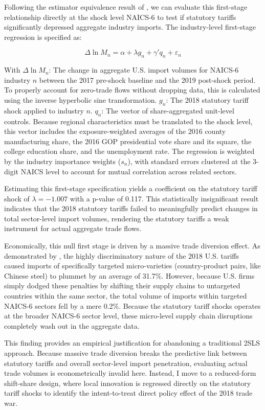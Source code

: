 \documentclass[12pt]{article}
\numberwithin{figure}{section}
\numberwithin{table}{section}
\begin{document}
Following the estimator equivalence result of \cite{BHJ2022}, we can evaluate this first-stage relationship directly at the shock level NAICS-6 to test if statutory tariffs significantly depressed aggregate industry imports. The industry-level first-stage regression is specified as:

$$ \Delta \ln M_n = \alpha + \lambda g_n + \gamma' q_n + \varepsilon_n $$

With $\Delta \ln M_n$: The change in aggregate U.S. import volumes for NAICS-6 industry $n$ between the 2017 pre-shock baseline and the 2019 post-shock period. To properly account for zero-trade flows without dropping data, this is calculated using the inverse hyperbolic sine transformation.
$g_n$: The 2018 statutory tariff shock applied to industry $n$.
$q_n$: The vector of share-aggregated unit-level controls. Because regional characteristics must be translated to the shock level, this vector includes the exposure-weighted averages of the 2016 county manufacturing share, the 2016 GOP presidential vote share and its square, the college education share, and the unemployment rate. The regression is weighted by the industry importance weights ($s_n$), with standard errors clustered at the 3-digit NAICS level to account for mutual correlation across related sectors.

Estimating this first-stage specification yields a coefficient on the statutory tariff shock of $\lambda = -1.007$ with a p-value of 0.117. This statistically insignificant result indicates that the 2018 statutory tariffs failed to meaningfully predict changes in total sector-level import volumes, rendering the statutory tariffs a weak instrument for actual aggregate trade flows. 

Economically, this null first stage is driven by a massive trade diversion effect. As demonstrated by \cite{Fajgelbaum2020}, the highly discriminatory nature of the 2018 U.S. tariffs caused imports of specifically targeted micro-varieties (country-product pairs, like Chinese steel) to plummet by an average of 31.7\%. However, because U.S. firms simply dodged these penalties by shifting their supply chains to untargeted countries within the same sector, the total volume of imports within targeted NAICS-6 sectors fell by a mere 0.2\%. Because the statutory tariff shocks operates at the broader NAICS-6 sector level, these micro-level supply chain disruptions completely wash out in the aggregate data.

This finding provides an empirical justification for abandoning a traditional 2SLS approach. Because massive trade diversion breaks the predictive link between statutory tariffs and overall sector-level import penetration, evaluating actual trade volumes is econometrically invalid here. Instead, I move to a reduced-form shift-share design, where local innovation is regressed directly on the statutory tariff shocks to identify the intent-to-treat direct policy effect of the 2018 trade war.
\end{document}
